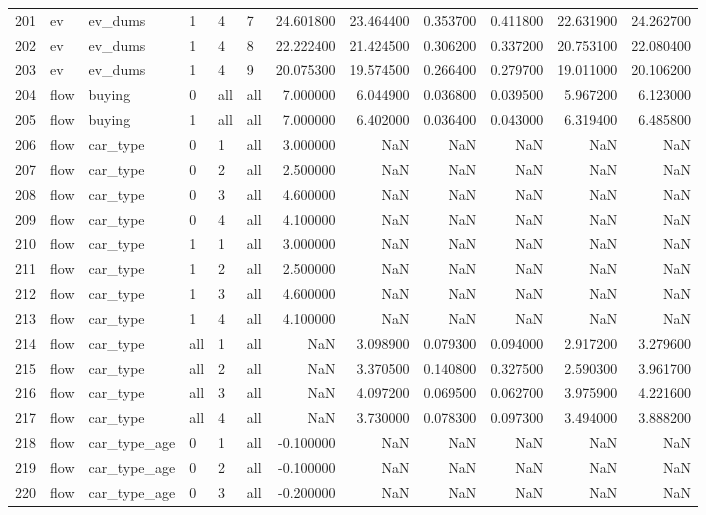 \begin{tabular}{llllllrrrrrr}
201 & ev & ev_dums & 1 & 4 & 7 & 24.601800 & 23.464400 & 0.353700 & 0.411800 & 22.631900 & 24.262700 \\
202 & ev & ev_dums & 1 & 4 & 8 & 22.222400 & 21.424500 & 0.306200 & 0.337200 & 20.753100 & 22.080400 \\
203 & ev & ev_dums & 1 & 4 & 9 & 20.075300 & 19.574500 & 0.266400 & 0.279700 & 19.011000 & 20.106200 \\
204 & flow & buying & 0 & all & all & 7.000000 & 6.044900 & 0.036800 & 0.039500 & 5.967200 & 6.123000 \\
205 & flow & buying & 1 & all & all & 7.000000 & 6.402000 & 0.036400 & 0.043000 & 6.319400 & 6.485800 \\
206 & flow & car_type & 0 & 1 & all & 3.000000 & NaN & NaN & NaN & NaN & NaN \\
207 & flow & car_type & 0 & 2 & all & 2.500000 & NaN & NaN & NaN & NaN & NaN \\
208 & flow & car_type & 0 & 3 & all & 4.600000 & NaN & NaN & NaN & NaN & NaN \\
209 & flow & car_type & 0 & 4 & all & 4.100000 & NaN & NaN & NaN & NaN & NaN \\
210 & flow & car_type & 1 & 1 & all & 3.000000 & NaN & NaN & NaN & NaN & NaN \\
211 & flow & car_type & 1 & 2 & all & 2.500000 & NaN & NaN & NaN & NaN & NaN \\
212 & flow & car_type & 1 & 3 & all & 4.600000 & NaN & NaN & NaN & NaN & NaN \\
213 & flow & car_type & 1 & 4 & all & 4.100000 & NaN & NaN & NaN & NaN & NaN \\
214 & flow & car_type & all & 1 & all & NaN & 3.098900 & 0.079300 & 0.094000 & 2.917200 & 3.279600 \\
215 & flow & car_type & all & 2 & all & NaN & 3.370500 & 0.140800 & 0.327500 & 2.590300 & 3.961700 \\
216 & flow & car_type & all & 3 & all & NaN & 4.097200 & 0.069500 & 0.062700 & 3.975900 & 4.221600 \\
217 & flow & car_type & all & 4 & all & NaN & 3.730000 & 0.078300 & 0.097300 & 3.494000 & 3.888200 \\
218 & flow & car_type_age & 0 & 1 & all & -0.100000 & NaN & NaN & NaN & NaN & NaN \\
219 & flow & car_type_age & 0 & 2 & all & -0.100000 & NaN & NaN & NaN & NaN & NaN \\
220 & flow & car_type_age & 0 & 3 & all & -0.200000 & NaN & NaN & NaN & NaN & NaN \\

\end{tabular}
